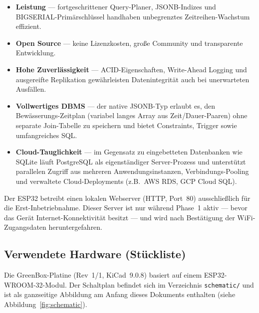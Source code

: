 \documentclass[a4paper,12pt]{article}
\begin{document}
\begin{itemize}
  \item \textbf{Leistung} --- fortgeschrittener Query-Planer, JSONB-Indizes
        und BIGSERIAL-Primärschlüssel handhaben unbegrenztes
        Zeitreihen-Wachstum effizient.
  \item \textbf{Open Source} --- keine Lizenzkosten, große Community und
        transparente Entwicklung.
  \item \textbf{Hohe Zuverlässigkeit} --- ACID-Eigenschaften, Write-Ahead
        Logging und ausgereifte Replikation gewährleisten Datenintegrität
        auch bei unerwarteten Ausfällen.
  \item \textbf{Vollwertiges DBMS} --- der native JSONB-Typ erlaubt es,
        den Bewässerungs-Zeitplan (variabel langes Array aus
        Zeit/Dauer-Paaren) ohne separate Join-Tabelle zu speichern und
        bietet Constraints, Trigger sowie umfangreiches SQL.
  \item \textbf{Cloud-Tauglichkeit} --- im Gegensatz zu eingebetteten
        Datenbanken wie SQLite läuft PostgreSQL als eigenständiger
        Server-Prozess und unterstützt parallelen Zugriff aus
        mehreren Anwendungsinstanzen, Verbindungs-Pooling und
        verwaltete Cloud-Deployments (z.B.\ AWS RDS, GCP Cloud SQL).
\end{itemize}

Der ESP32 betreibt einen lokalen Webserver (HTTP, Port~80) ausschließlich
für die Erst-Inbetriebnahme. Dieser Server ist nur während Phase~1
aktiv --- bevor das Gerät Internet-Konnektivität besitzt --- und wird
nach Bestätigung der WiFi-Zugangsdaten heruntergefahren.

\subsection{Verwendete Hardware (Stückliste)}

Die GreenBox-Platine (Rev~1/1, KiCad~9.0.8) basiert auf einem
ESP32-WROOM-32-Modul. Der Schaltplan befindet sich im Verzeichnis
\texttt{schematic/} und ist als ganzseitige Abbildung am Anfang dieses
Dokuments enthalten (siehe Abbildung~\ref{fig:schematic}).
\end{document}
